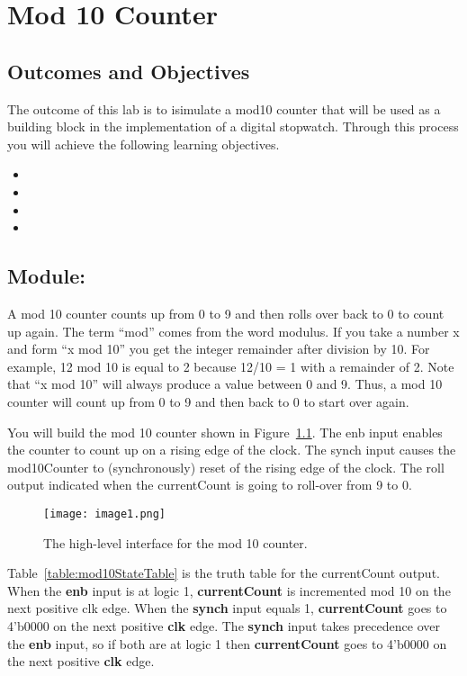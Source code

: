 \chapter{Mod 10 Counter}
\label{chapter:mod10}
\graphicspath{ {./Lab08Mod10Counter/Fig} }

\section{Outcomes and Objectives}

The outcome of this lab is to isimulate a mod10 counter
that will be used as a building block in the implementation
of a digital stopwatch.
Through this process you will achieve the following
learning objectives.
\begin{itemize}
    \item {}
    \item {}
    \item {}
    \item {}
\end{itemize}

\section{Module: }

A mod 10 counter counts up from 0 to 9 and then rolls over back to 0 to
count up again. The term ``mod'' comes from the word modulus. If you
take a number x and form ``x mod 10'' you get the integer remainder
after division by 10. For example, 12 mod 10 is equal to 2 because 12/10
= 1 with a remainder of 2. Note that ``x mod 10'' will always produce a
value between 0 and 9. Thus, a mod 10 counter will count up from 0 to 9
and then back to 0 to start over again.

You will build the mod 10 counter shown in Figure~\ref{fig:mod10Symbol}. The enb input
enables the counter to count up on a rising edge of the clock. The synch
input causes the mod10Counter to (synchronously) reset of the rising
edge of the clock. The roll output indicated when the currentCount is
going to roll-over from 9 to 0.

\begin{figure}[ht]
    \texttt{[image: image1.png]}
    \caption{The high-level interface for the mod 10 counter.}
    \label{fig:mod10Symbol}
\end{figure}

Table~\ref{table:mod10StateTable} is the truth table for the currentCount output. When the
\textbf{enb} input is at logic 1, \textbf{currentCount} is incremented
mod 10 on the next positive clk edge. When the \textbf{synch} input
equals 1, \textbf{currentCount} goes to 4'b0000 on the next positive
\textbf{clk} edge. The \textbf{synch} input takes precedence over the
\textbf{enb} input, so if both are at logic 1 then \textbf{currentCount}
goes to 4'b0000 on the next positive \textbf{clk} edge.

